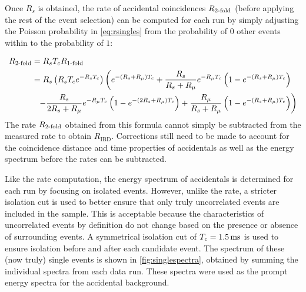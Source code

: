 Once $R_s$ is obtained, the rate of accidental coincidences $R_{\text{\ensuremath{2}-fold}}$
(before applying the rest of the event selection)
can be computed for each run
by simply adjusting the Poisson probability in \cref{eq:rsingles}
from the probability of $0$ other events within \tc{}
to the probability of $1$:

\begin{align}
    \label{eq:racc}
    \begin{split}
        R_{\text{\fold{2}}} &= R_s\tc R_{\text{\fold{1}}} \\
                   &= R_s \left(R_s\tc e^{-R_s\tc}\right)
          \left(
              e^{-(R_s + R_\mu)\tc} +
              \frac{R_s}{R_s+R_\mu} e^{-R_\mu\tc}
              \left(
                  1 - e^{-(R_s + R_\mu)\tc}
              \right)
          \right. \\
          &\ \ %
          \left. - \frac{R_s}{2R_s + R_\mu} e^{-R_\mu\tc}
              \left(
                  1 - e^{-(2R_s + R_\mu)\tc}
              \right) +
              \frac{R_\mu}{R_s + R_\mu}
              \left(
                  1 - e^{-(R_s + R_\mu)\tc}
              \right)
          \right)
    \end{split}
\end{align}
The rate $R_{\text{\ensuremath{2}-fold}}$ obtained from this formula
cannot simply be subtracted from the measured  rate
to obtain $R_{\text{IBD}}$.
Corrections still need to be made to account for
the coincidence distance and time properties of accidentals
as well as the energy spectrum
before the rates can be subtracted.

Like the rate computation, the energy spectrum of accidentals is determined for each run
by focusing on isolated events.
However, unlike the rate, a stricter isolation cut is used
to better ensure that only truly uncorrelated events are included in the sample.
This is acceptable because the characteristics of uncorrelated events
by definition do not change based on the presence or absence
of surrounding events.
A symmetrical isolation cut of $T_c=\SI{1.5}{\milli\second}$ is used
to ensure isolation before and after each candidate event.
The spectrum of these (now truly) single events is shown in \cref{fig:singlespectra},
obtained by summing the individual spectra from each data run.
These spectra were used as the prompt energy spectra for the accidental background.


